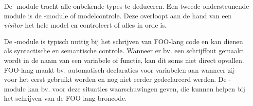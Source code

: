 De -module tracht alle onbekende types te deduceren. Een tweede
ondersteunende module is de -module of modelcontrole. Deze
overloopt aan de hand van een \emph{visitor} het hele model en controleert of
alles in orde is.

De -module is typisch nuttig bij het schrijven van FOO-lang code
en kan dienen als syntactische en semantische controle. Wanneer er bv. een
schrijffout gemaakt wordt in de naam van een variabele of functie, kan dit soms
niet direct opvallen. FOO-lang maakt bv. automatisch declaraties voor
variabelen aan wanneer zij voor het eerst gebruikt worden en nog niet eerder
gedeclareerd werden. De -module kan bv. voor deze situaties
waarschuwingen geven, die kunnen helpen bij het schrijven van de FOO-lang
broncode.
